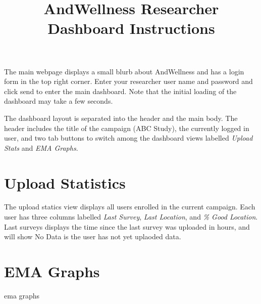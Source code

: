\documentclass{article}
\title{AndWellness Researcher Dashboard Instructions}
\begin{document}
\maketitle

The main webpage displays a small blurb about AndWellness and has a
login form in the top right corner.  Enter your researcher user name
and password and click send to enter the main dashboard.  Note that
the initial loading of the dashboard may take a few seconds.

The dashboard layout is separated into the header and the main body.
The header includes the title of the campaign (ABC Study), the
currently logged in user, and two tab buttons to switch among the
dashboard views labelled \emph{Upload Stats} and \emph{EMA Graphs}.

\section{Upload Statistics}

The upload statics view displays all users enrolled in the current
campaign.  Each user has three columns labelled \emph{Last Survey},
\emph{Last Location}, and \emph{\% Good Location}.  Last surveys
displays the time since the last survey was uploaded in hours, and
will show No Data is the user has not yet uplaoded data.

\section{EMA Graphs}
ema graphs
\end{document}
